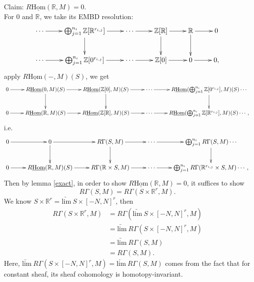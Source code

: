 \documentclass[UTF8,12,a4paper]{ctexart}
\theoremstyle{definition}
\begin{document}
Claim: $R\underline{\text{Hom}}(\mathbb{R},M)= 0.$\\
For 0 and $\mathbb{R}$, we take its EMBD resolution:
\begin{equation*}
\xymatrix
{
\cdots\ar[r]&\bigoplus_{j=1}^{n_i}\mathbb{Z}[\mathbb{R}^{r_{i,j}}]\ar[d]\ar[r] &\cdots  \ar[r]&\mathbb{Z}[\mathbb{R}]\ar[d]\ar[r]&\mathbb{R}\ar[d]\ar[r]&0\\
\cdots\ar[r]&\bigoplus_{j=1}^{n_i}\mathbb{Z}[0^{r_{i,j}}]\ar[r]&\cdots \ar[r]&\mathbb{Z}[0]\ar[r]&0\ar[r] &0,
}
\end{equation*}
apply $R\underline{\text{Hom}}(-,M)(S)$, we get 
\begin{equation*}
\xymatrix
{
0\ar[r]&R\underline{\text{Hom}}(0,M)(S)\ar[d]\ar[r]& R\underline{\text{Hom}}(\mathbb{Z}[0],M)(S)\ar[d]\ar[r]&\cdots\ar[r]& R\underline{\text{Hom}}(\bigoplus_{j=1}^{n_i}\mathbb{Z}[0^{r_{i,j}}],M)(S)\ar[d]\cdots\\
0\ar[r]& R\underline{\text{Hom}}(\mathbb{R},M)(S)\ar[r]& R\underline{\text{Hom}}(\mathbb{Z}[\mathbb{R}],M)(S)\ar[r]&\cdots \ar[r]& R\underline{\text{Hom}}(\bigoplus_{j=1}^{n_i}\mathbb{Z}[\mathbb{R}^{r_{i,j}}],M)(S)\cdots,
}
\end{equation*}
i.e.
\begin{equation*}
\xymatrix
{
	0\ar[r]&0\ar[d]\ar[r]& R\Gamma(S,M)\ar[d]\ar[r]&\cdots\ar[r]& \bigoplus_{j=1}^{n_i}R\Gamma(S,M)\ar[d]\cdots\\
	0\ar[r]& R\underline{\text{Hom}}(\mathbb{R},M)(S)\ar[r]& R\Gamma(\mathbb{R}\times S,M)\ar[r]&\cdots \ar[r]& \bigoplus_{j=1}^{n_i}R\Gamma(\mathbb{R}^{r_{i,j}}\times S,M)\cdots,
}
\end{equation*}
Then by lemma \ref{exact}, in order to show $R\underline{\text{Hom}}(\mathbb{R},M)=0$, it suffices to show 
$$
R\Gamma(S,M)=R\Gamma(S\times \mathbb{R}^r,M).
$$
We know $S\times \mathbb{R}^r=\underrightarrow{\text{lim}}\  S\times [-N,N]^r$, then
\begin{align*}
R\Gamma(S\times \mathbb{R}^r,M)
&=R\Gamma(\underrightarrow{\text{lim}}\  S\times [-N,N]^r,M)\\
&=\underleftarrow{\text{lim}}\ R\Gamma(S\times [-N,N]^r,M)\\
&=\underleftarrow{\text{lim}}\ R\Gamma(S,M)\\
&=R\Gamma(S,M).
\end{align*}
Here, $\underleftarrow{\text{lim}}\ R\Gamma(S\times [-N,N]^r,M)=\underleftarrow{\text{lim}}\ R\Gamma(S,M)$ comes from the fact that for constant sheaf, its sheaf cohomology is homotopy-invariant.
~\\
\end{document}
